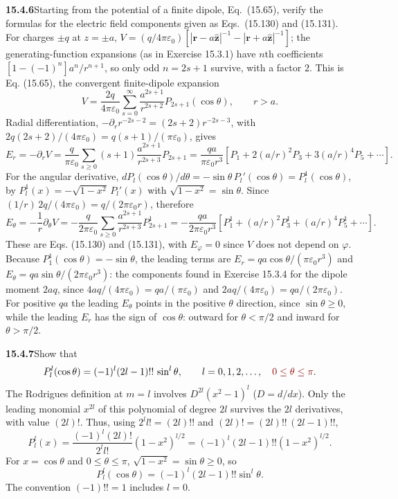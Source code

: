 \par\bigskip
\noindent\textbf{15.4.6}\quad Starting from the potential of a finite
dipole, Eq.~(15.65), verify the formulas for the electric field
components given as Eqs.~(15.130) and (15.131).
\solution
For charges $\pm q$ at $z=\pm a$,
$V=(q/4\pi\varepsilon_0)[|\mathbf r-a\hat{\mathbf z}|^{-1}
-|\mathbf r+a\hat{\mathbf z}|^{-1}]$; the generating-function expansions
(as in Exercise 15.3.1) have $n$th coefficients
$[1-(-1)^n]a^n/r^{n+1}$, so only odd $n=2s+1$ survive, with a factor
$2$. This is Eq. (15.65), the convergent finite-dipole expansion
\[
V=\frac{2q}{4\pi\varepsilon_0}
\sum_{s=0}^\infty\frac{a^{2s+1}}{r^{2s+2}}
P_{2s+1}(\cos\theta),\qquad r>a.
\]
Radial differentiation, $-\partial_rr^{-2s-2}=(2s+2)r^{-2s-3}$, with
$2q(2s+2)/(4\pi\varepsilon_0)=q(s+1)/(\pi\varepsilon_0)$, gives
\[
E_r=-\partial_rV=\frac{q}{\pi\varepsilon_0}
\sum_{s\ge0}(s+1)\frac{a^{2s+1}}{r^{2s+3}}P_{2s+1}
=\boxed{\frac{qa}{\pi\varepsilon_0r^3}
\left[P_1+2(a/r)^2P_3+3(a/r)^4P_5+\cdots\right]}.
\]
For the angular derivative,
$dP_l(\cos\theta)/d\theta=-\sin\theta\,P_l'(\cos\theta)
=P_l^1(\cos\theta)$, by $P_l^1(x)=-\sqrt{1-x^2}\,P_l'(x)$ with
$\sqrt{1-x^2}=\sin\theta$. Since
$(1/r)\,2q/(4\pi\varepsilon_0)=q/(2\pi\varepsilon_0r)$, therefore
\[
E_\theta=-\frac1r\partial_\theta V
=-\frac q{2\pi\varepsilon_0}\sum_{s\ge0}\frac{a^{2s+1}}{r^{2s+3}}
P_{2s+1}^1
=\boxed{-\frac{qa}{2\pi\varepsilon_0r^3}
\left[P_1^1+(a/r)^2P_3^1+(a/r)^4P_5^1+\cdots\right]}.
\]
These are Eqs. (15.130) and (15.131), with $E_\varphi=0$ since $V$
does not depend on $\varphi$.
Because $P_1^1(\cos\theta)=-\sin\theta$, the leading terms are
$E_r=qa\cos\theta/(\pi\varepsilon_0r^3)$ and
$E_\theta=qa\sin\theta/(2\pi\varepsilon_0r^3)$: the components found in
Exercise 15.3.4 for the dipole moment $2aq$, since
$4aq/(4\pi\varepsilon_0)=qa/(\pi\varepsilon_0)$ and
$2aq/(4\pi\varepsilon_0)=qa/(2\pi\varepsilon_0)$. For positive $qa$ the
leading $E_\theta$ points in the positive $\theta$ direction, since
$\sin\theta\ge0$, while the leading $E_r$ has the sign of $\cos\theta$:
outward for $\theta<\pi/2$ and inward for $\theta>\pi/2$.

\par\bigskip
\noindent\textbf{15.4.7}\quad Show that
\[
P_{l}^{l}(\cos\theta)=(-1)^{l}(2l-1)!!\,\sin^{l}\theta,
\qquad l=0,1,2,\ldots,\quad \erratum{0\le\theta\le\pi}.
\]
\solution
The Rodrigues definition at $m=l$ involves $D^{2l}(x^2-1)^l$
($D=d/dx$). Only the leading monomial $x^{2l}$ of this polynomial of
degree $2l$ survives the $2l$ derivatives, with value $(2l)!$. Thus,
using $2^ll!=(2l)!!$ and $(2l)!=(2l)!!\,(2l-1)!!$,
\[
P_l^l(x)=\frac{(-1)^l(2l)!}{2^ll!}(1-x^2)^{l/2}
=(-1)^l(2l-1)!!(1-x^2)^{l/2}.
\]
For $x=\cos\theta$ and $0\le\theta\le\pi$,
$\sqrt{1-x^2}=\sin\theta\ge0$, so
\[
\boxed{P_l^l(\cos\theta)=(-1)^l(2l-1)!!\sin^l\theta}.
\]
The convention $(-1)!!=1$ includes $l=0$.

